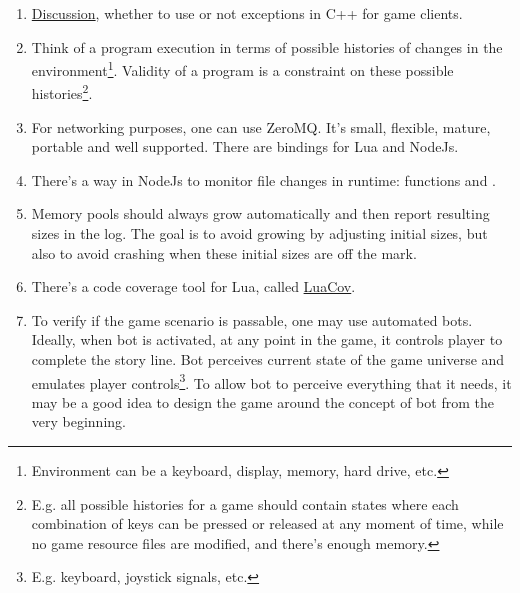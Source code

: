 \documentclass[12pt]{article}
\newcommand{\mylstinline}[2]{\fbox{\lstinline[language=#1]{#2}}}
\begin{document}
\begin{enumerate}
    \item
        \href{http://gamedev.stackexchange.com/questions/46424/try-catch-or-%
ifs-for-error-handling-in-c}%
        {Discussion}, whether to use or not exceptions in C++ for game clients.
    \item
        Think of a program execution in terms of possible histories of
        changes in the environment\footnote{
            Environment can be a keyboard, display, memory, hard drive, etc.
        }.
        Validity of a program is a constraint on these possible
        histories\footnote{
            E.g. all possible histories for a game should contain states where
            each combination of keys can be pressed or released at any moment
            of time, while no game resource files are modified, and
            there's enough memory.
        }.
    \item
        For networking purposes, one can use ZeroMQ.
        It's small, flexible, mature, portable and well supported.
        There are bindings for Lua and NodeJs.
    \item
        There's a way in NodeJs to monitor file changes in runtime:
        functions \mylstinline{bash}{fs.watch} and
        \mylstinline{bash}{fs.watchFile}.
    \item
        Memory pools should always grow automatically and then report
        resulting sizes in the log.
        The goal is to avoid growing by adjusting initial sizes, but also
        to avoid crashing when these initial sizes are off the mark.
    \item
        There's a code coverage tool for Lua, called
        \href{https://github.com/keplerproject/luacov}{LuaCov}.
    \item
        To verify if the game scenario is passable, one may use automated bots.
        Ideally, when bot is activated, at any point in the game,
        it controls player to complete the story line.
        Bot perceives current state of the game universe and emulates
        player controls\footnote{
            E.g. keyboard, joystick signals, etc.
        }.
        To allow bot to perceive everything that it needs, it may be a good
        idea to design the game around the concept of bot from the very
        beginning.
        
\end{enumerate}
\end{document}
